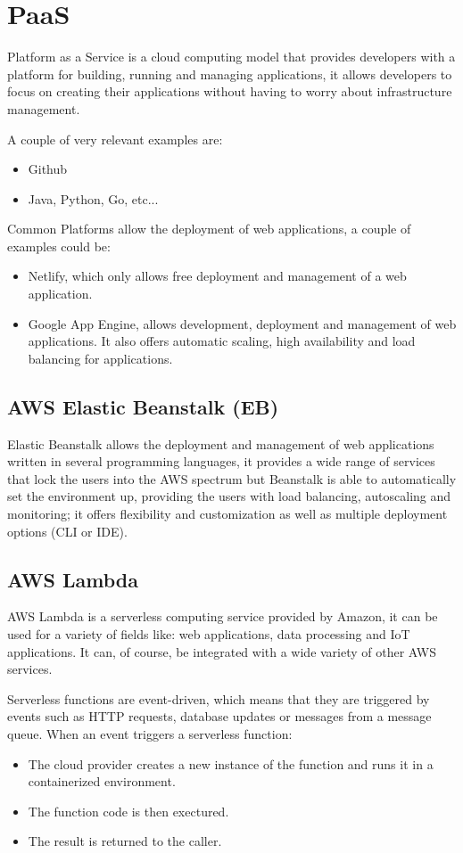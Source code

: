 \chapter{PaaS}
Platform as a Service is a cloud computing model that provides developers with a platform for building, running and managing applications, it allows developers to focus on creating their applications without having to worry about infrastructure management.

A couple of very relevant examples are:
\begin{itemize}
	\item Github
	\item Java, Python, Go, etc...
\end{itemize}
Common Platforms allow the deployment of web applications, a couple of examples could be:
\begin{itemize}
	\item Netlify, which only allows free deployment and management of a web application.
	\item Google App Engine, allows development, deployment and management of web applications. It also offers automatic scaling, high availability and load balancing for applications.
\end{itemize}

\section{AWS Elastic Beanstalk (EB)}
Elastic Beanstalk allows the deployment and management of web applications written in several
programming languages, it provides a wide range of services that lock the users into the AWS
spectrum but Beanstalk is able to automatically set the environment up, providing the users with
load balancing, autoscaling and monitoring; it offers flexibility and customization as well as
multiple deployment options (CLI or IDE).

\section{AWS Lambda}
AWS Lambda is a serverless computing service provided by Amazon, it can be used for a variety of fields like: web applications, data processing and IoT applications. It can, of course, be integrated with a wide variety of other AWS services.

Serverless functions are event-driven, which means that they are triggered by events such as HTTP requests, database updates or messages from a message queue. When an event triggers a serverless function:
\begin{itemize}
	\item The cloud provider creates a new instance of the function and runs it in a containerized
	      environment.
	\item The function code is then exectured.
	\item The result is returned to the caller.
\end{itemize}

